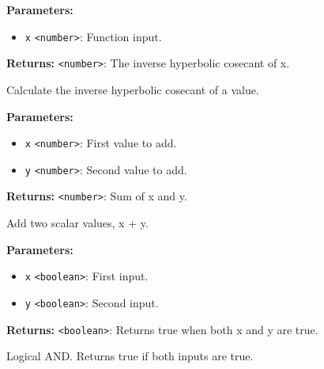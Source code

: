 \documentclass[12pt,a4paper]{article}
\begin{document}
\noindent \textbf{Parameters:}
\begin{itemize}
  \item \texttt{x} \texttt{<number>}: Function input.
\end{itemize}

\noindent \textbf{Returns:} \texttt{<number>}: The inverse hyperbolic cosecant of \textasciigrave{}x\textasciigrave{}.

\noindent Calculate the inverse hyperbolic cosecant of a value.

\vspace{5mm}
\noindent {}


\noindent \textbf{Parameters:}
\begin{itemize}
  \item \texttt{x} \texttt{<number>}: First value to add.
  \item \texttt{y} \texttt{<number>}: Second value to add.
\end{itemize}

\noindent \textbf{Returns:} \texttt{<number>}: Sum of \textasciigrave{}x\textasciigrave{} and \textasciigrave{}y\textasciigrave{}.

\noindent Add two scalar values, \textasciigrave{}x + y\textasciigrave{}.

\vspace{5mm}
\noindent {}


\noindent \textbf{Parameters:}
\begin{itemize}
  \item \texttt{x} \texttt{<boolean>}: First input.
  \item \texttt{y} \texttt{<boolean>}: Second input.
\end{itemize}

\noindent \textbf{Returns:} \texttt{<boolean>}: Returns true when both \textasciigrave{}x\textasciigrave{} and \textasciigrave{}y\textasciigrave{} are true.

\noindent Logical AND. Returns true if both inputs are true.

\vspace{5mm}
\noindent {}
\end{document}
